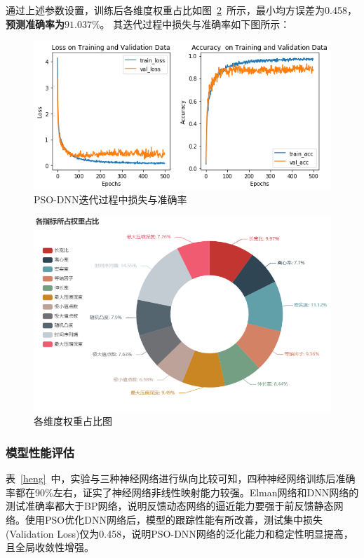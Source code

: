 \documentclass{whutmod}
\begin{document}
	通过上述参数设置，训练后各维度权重占比如图~\ref{quanzhong}~所示，最小均方误差为0.458，\textbf{预测准确率为$91.037\%$}。
	其迭代过程中损失与准确率如下图所示：
	\begin{figure}[H]
		\centering
		\includegraphics[width=\textwidth]{figures/x.png}
		\caption{PSO-DNN迭代过程中损失与准确率}\label{xxx}
	\end{figure}

	\begin{figure}[H]
	\centering
	\includegraphics[width=\textwidth]{figures/quanzhong2.png}
	\caption{各维度权重占比图}\label{quanzhong}
\end{figure}
	\subsubsection{模型性能评估}
	表~\ref{heng}~中，实验与三种神经网络进行纵向比较可知，四种神经网络训练后准确率都在90\%左右，证实了神经网络非线性映射能力较强。Elman网络和DNN网络的测试准确率都大于BP网络，说明反馈动态网络的逼近能力要强于前反馈静态网络。使用PSO优化DNN网络后，模型的跟踪性能有所改善，测试集中损失(Validation Loss)仅为0.458，说明PSO-DNN网络的泛化能力和稳定性明显提高，且全局收敛性增强。
	
\end{document}
